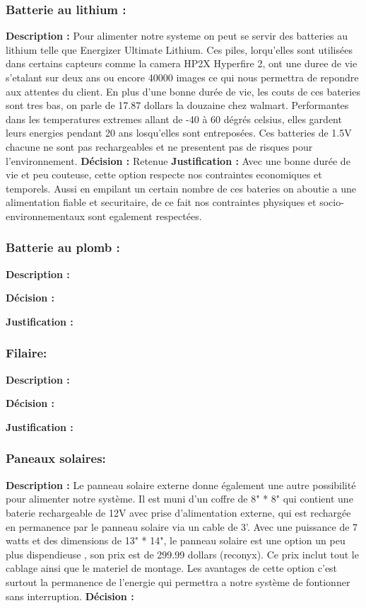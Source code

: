  \subsubsection{Batterie au lithium :}
 \textbf{Description :}
 Pour alimenter notre systeme on peut se servir des batteries au lithium telle que  Energizer Ultimate Lithium. Ces piles, lorqu'elles sont utilisées dans certains capteurs comme la camera HP2X Hyperfire 2, ont une duree de vie s'etalant sur deux ans ou encore 40000 images ce qui nous permettra de repondre aux attentes du client. En plus d'une bonne durée de vie, les couts de ces bateries sont tres bas, on parle de 17.87 dollars la douzaine chez walmart. Performantes dans les temperatures extremes allant de -40 à 60 dégrés celsius, elles gardent leurs energies pendant 20 ans losqu'elles sont entreposées. Ces batteries de 1.5V chacune ne sont pas rechargeables et ne presentent pas de risques pour l'environnement.
 \textbf{Décision :}
 Retenue
 \textbf{Justification :}
 Avec une bonne durée de vie et peu couteuse, cette option respecte nos contraintes economiques et temporels. Aussi en empilant un certain nombre de ces bateries on aboutie a une alimentation fiable et securitaire, de ce fait nos contraintes physiques et socio-environnementaux sont egalement respectées.
 \subsubsection{Batterie au plomb :}
 \textbf{Description :}
 
 \textbf{Décision :}
 
 \textbf{Justification :}
 
 \subsubsection{Filaire:}
 \textbf{Description :}
 
 \textbf{Décision :}
 
 \textbf{Justification :}
 
 \subsubsection{Paneaux solaires:}
 \textbf{Description :}
  Le panneau solaire externe donne également une autre possibilité pour alimenter notre système. Il est muni d'un coffre de 8" * 8" qui contient une baterie rechargeable de 12V avec prise d'alimentation externe, qui est rechargée en permanence par le panneau solaire via un cable de 3'. Avec une puissance de 7 watts et des dimensions de 13" * 14", le panneau solaire est une option un peu plus dispendieuse , son prix est de 299.99 dollars (reconyx). Ce prix inclut tout le cablage ainsi que le materiel de montage. Les avantages de cette option c'est surtout la permanence de l'energie qui permettra a notre système de fontionner sans interruption.
 \textbf{Décision :}
 
